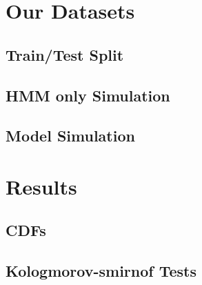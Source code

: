 
\section{Our Datasets}

\subsection{Train/Test Split}

\subsection{HMM only Simulation}

\subsection{Model Simulation}

\section{Results}

\subsection{CDFs}

\subsection{Kologmorov-smirnof Tests}



